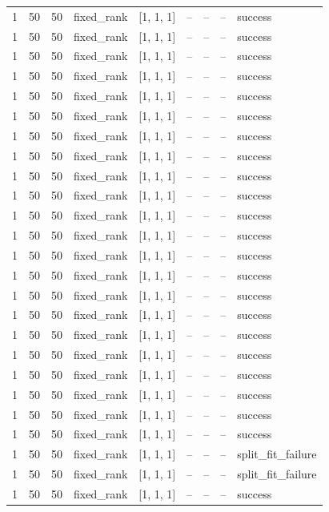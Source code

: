 \begin{longtable}{lllllllll}
1 & 50 & 50 & fixed\_rank & [1, 1, 1] & -- & -- & -- & success \\
1 & 50 & 50 & fixed\_rank & [1, 1, 1] & -- & -- & -- & success \\
1 & 50 & 50 & fixed\_rank & [1, 1, 1] & -- & -- & -- & success \\
1 & 50 & 50 & fixed\_rank & [1, 1, 1] & -- & -- & -- & success \\
1 & 50 & 50 & fixed\_rank & [1, 1, 1] & -- & -- & -- & success \\
1 & 50 & 50 & fixed\_rank & [1, 1, 1] & -- & -- & -- & success \\
1 & 50 & 50 & fixed\_rank & [1, 1, 1] & -- & -- & -- & success \\
1 & 50 & 50 & fixed\_rank & [1, 1, 1] & -- & -- & -- & success \\
1 & 50 & 50 & fixed\_rank & [1, 1, 1] & -- & -- & -- & success \\
1 & 50 & 50 & fixed\_rank & [1, 1, 1] & -- & -- & -- & success \\
1 & 50 & 50 & fixed\_rank & [1, 1, 1] & -- & -- & -- & success \\
1 & 50 & 50 & fixed\_rank & [1, 1, 1] & -- & -- & -- & success \\
1 & 50 & 50 & fixed\_rank & [1, 1, 1] & -- & -- & -- & success \\
1 & 50 & 50 & fixed\_rank & [1, 1, 1] & -- & -- & -- & success \\
1 & 50 & 50 & fixed\_rank & [1, 1, 1] & -- & -- & -- & success \\
1 & 50 & 50 & fixed\_rank & [1, 1, 1] & -- & -- & -- & success \\
1 & 50 & 50 & fixed\_rank & [1, 1, 1] & -- & -- & -- & success \\
1 & 50 & 50 & fixed\_rank & [1, 1, 1] & -- & -- & -- & success \\
1 & 50 & 50 & fixed\_rank & [1, 1, 1] & -- & -- & -- & success \\
1 & 50 & 50 & fixed\_rank & [1, 1, 1] & -- & -- & -- & success \\
1 & 50 & 50 & fixed\_rank & [1, 1, 1] & -- & -- & -- & success \\
1 & 50 & 50 & fixed\_rank & [1, 1, 1] & -- & -- & -- & success \\
1 & 50 & 50 & fixed\_rank & [1, 1, 1] & -- & -- & -- & split\_fit\_failure \\
1 & 50 & 50 & fixed\_rank & [1, 1, 1] & -- & -- & -- & split\_fit\_failure \\
1 & 50 & 50 & fixed\_rank & [1, 1, 1] & -- & -- & -- & success \\

\end{longtable}
